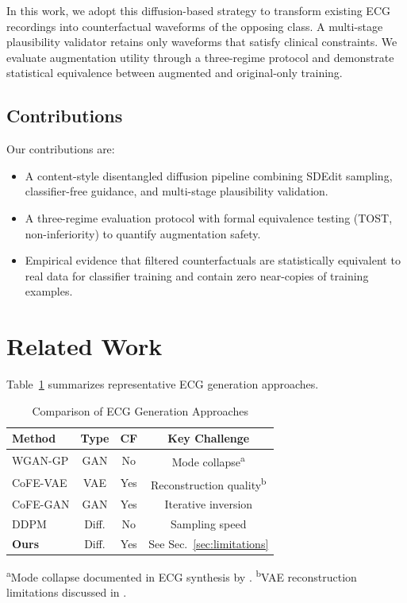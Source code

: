 \documentclass[conference]{IEEEtran}
\begin{document}
In this work, we adopt this diffusion-based strategy to transform existing ECG recordings into counterfactual waveforms of the opposing class. A multi-stage plausibility validator retains only waveforms that satisfy clinical constraints. We evaluate augmentation utility through a three-regime protocol and demonstrate statistical equivalence between augmented and original-only training.

\subsection{Contributions}
Our contributions are:
\begin{itemize}
  \item A content-style disentangled diffusion pipeline combining SDEdit sampling, classifier-free guidance, and multi-stage plausibility validation.
  \item A three-regime evaluation protocol with formal equivalence testing (TOST, non-inferiority) to quantify augmentation safety.
  \item Empirical evidence that filtered counterfactuals are statistically equivalent to real data for classifier training and contain zero near-copies of training examples.
\end{itemize}


\section{Related Work}

Table~\ref{tab:related} summarizes representative ECG generation approaches.

\begin{table}[t]
\centering
\caption{Comparison of ECG Generation Approaches}
\label{tab:related}
\begin{tabular}{lccc}
\toprule
\textbf{Method} & \textbf{Type} & \textbf{CF} & \textbf{Key Challenge} \\
\midrule
WGAN-GP \cite{gulrajani2017} & GAN & No & Mode collapse\textsuperscript{a} \\
CoFE-VAE \cite{nemirovsky2021} & VAE & Yes & Reconstruction quality\textsuperscript{b} \\
CoFE-GAN \cite{jang2025cofe} & GAN & Yes & Iterative inversion \\
DDPM \cite{ho2020} & Diff. & No & Sampling speed \\
\textbf{Ours} & Diff. & Yes & See Sec.~\ref{sec:limitations} \\
\bottomrule
\end{tabular}

\vspace{1mm}
\footnotesize{\textsuperscript{a}Mode collapse documented in ECG synthesis by \cite{delaney2019}.}
\footnotesize{\textsuperscript{b}VAE reconstruction limitations discussed in \cite{bredell2023}.}
\end{table}
\end{document}
